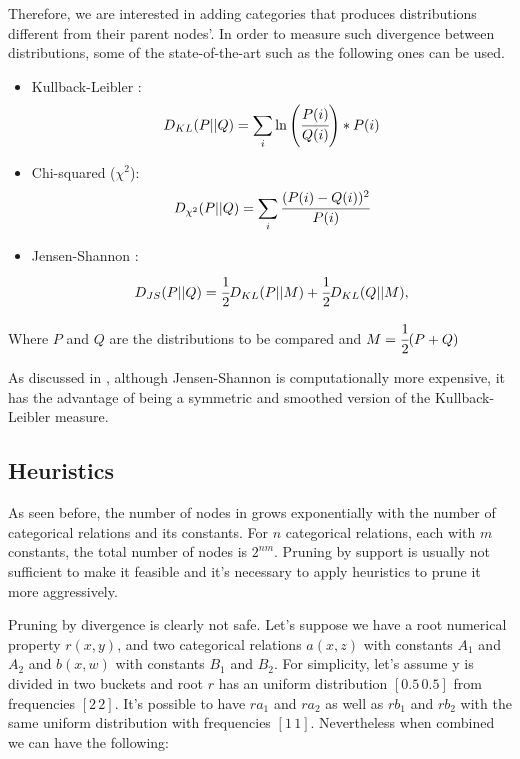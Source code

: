 Therefore, we are interested in adding categories that produces distributions different from their parent nodes'. In
order to measure such divergence between distributions, some of the state-of-the-art such as the following ones can be
used.

\begin{itemize}
 \item Kullback-Leibler \cite{Kullback51klDivergence}: 
    \begin{equation}
      D_{KL}(P||Q)=\sum_{\substack{i}}\ln\left(\cfrac{P(i)}{Q(i)}\right)*P(i)
    \end{equation}
 \item Chi-squared ($\chi^2$):
    \begin{equation}
      D_{\chi^2}(P||Q)=\sum_{\substack{i}}\cfrac{(P(i)-Q(i))^2}{P(i)}
    \end{equation}
 \item Jensen-Shannon \cite{17795}:
    \begin{equation}
      D_{JS}(P||Q)=\cfrac{1}{2}D_{KL}(P||M)+\cfrac{1}{2}D_{KL}(Q||M), 
    \end{equation}
\end{itemize}

Where $P$ and $Q$ are the distributions to be compared and $M=\cfrac{1}{2}(P+Q)$

As discussed in \cite{17795}, although Jensen-Shannon is computationally more expensive, it has the advantage of being a
symmetric and smoothed version of the Kullback-Leibler measure.


\subsection{Heuristics}

As seen before, the number of nodes in \graphname grows exponentially with the number of categorical relations
and its constants. For $n$ categorical relations, each with $m$ constants, the total number of nodes is $2^{nm}$.
Pruning by support is usually not sufficient to make it feasible and it's necessary to apply
heuristics to prune it more aggressively.


Pruning by divergence is clearly not safe. Let's suppose we have a root numerical property $r(x,y)$, and two categorical
relations $a(x,z)$ with constants $A_1$ and $A_2$ and $b(x,w)$ with constants $B_1$ and $B_2$. For simplicity, let's
assume y is divided in two buckets and root $r$ has an uniform distribution $[0.5 \, 0.5]$ from frequencies $[2 \, 2]$.
It's possible to have $r a_1$ and $r a_2$ as well as $r b_1$ and $r b_2$ with the same uniform distribution with
frequencies $[1 \, 1]$. Nevertheless when combined we can have the following:

